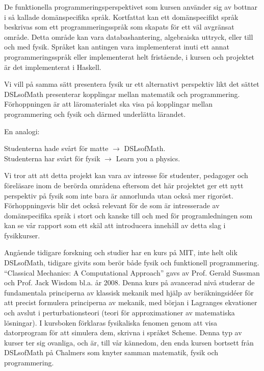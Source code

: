 \begin{draft}
De funktionella programmeringsperspektivet som kursen använder sig av bottnar i
så kallade domänspecifika språk. Kortfattat kan ett domänspecifikt språk
beskrivas som ett programmeringsspråk som skapats för ett väl avgränsat
område. Detta område kan vara databashantering, algebraiska uttryck, eller till
och med fysik. Språket kan antingen vara implementerat inuti ett annat
programmeringsspråk eller implementerat helt fristående, i kursen och projektet 
är det implementerat i Haskell.

Vi vill på samma sätt 
presentera fysik ur ett alternativt perspektiv likt det sättet DSLsofMath
presenterar kopplingar mellan matematik och programmering. Förhoppningen är att
läromaterialet ska visa på kopplingar mellan programmering och fysik och därmed
underlätta lärandet.

En analogi:

Studenterna hade svårt för matte $\rightarrow $ DSLsofMath.\\ 
Studenterna har svårt för fysik $\rightarrow $ Learn you a physics.

Vi tror att att detta projekt kan vara av intresse för studenter, pedagoger och
föreläsare inom de berörda områdena eftersom det här projektet ger ett nytt
perspektiv på fysik som inte bara är annorlunda utan också mer rigoröst.
Förhoppningsvis blir det också relevant för de som är intresserade av
domänspecifika språk i stort och kanske till och med för programledningen som
kan se vår rapport som ett skäl att introducera innehåll av detta slag i
fysikkurser.

Angående tidigare forskning och studier har en kurs på MIT, inte helt olik
DSLsofMath, tidigare givits som berör både fysik och 
funktionell programmering.
``Classical Mechanics: A Computational Approach'' gavs av Prof.  Gerald Sussman
och Prof. Jack Wisdom bl.a. år 2008.\cite{classical-mechanics-course-mit-2008}
Denna kurs på avancerad nivå studerar de fundamentala principerna av klassisk
mekanik med hjälp av beräkningsidéer för att precist formulera principerna av
mekanik, med början i Lagranges ekvationer och avslut i perturbationsteori
(teori för approximationer av matematiska lösningar). I kursboken\cite{SICM}
förklaras fysikaliska fenomen genom att visa datorprogram för att simulera dem,
skrivna i språket Scheme.  Denna typ av kurser ter sig ovanliga, och är, till
vår kännedom, den enda kursen bortsett från DSLsofMath på Chalmers som knyter
samman matematik, fysik och programmering.


\end{draft}
